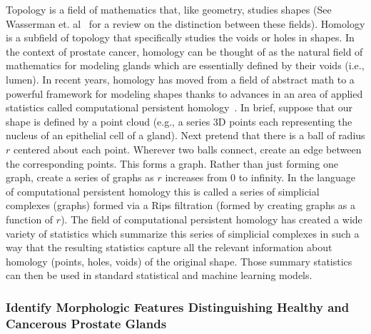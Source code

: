\documentclass{NIHGrant}
\theoremstyle{theorem}
\begin{document}
Topology is a field of mathematics that, like geometry, studies shapes (See Wasserman et. al~\cite{wasserman_topological_2018} for a review on the distinction between these fields). Homology is a subfield of topology that specifically studies the voids or holes in shapes. In the context of prostate cancer, homology can be thought of as the natural field of mathematics for modeling glands which are essentially defined by their voids (i.e., lumen). In recent years, homology has moved from a field of abstract math to a powerful framework for modeling shapes thanks to advances in an area of applied statistics called computational persistent homology~\cite{wasserman_topological_2018,chazal_introduction_2021}. In brief, suppose that our shape is defined by a point cloud (e.g., a series 3D points each representing the nucleus of an epithelial cell of a gland). Next pretend that there is a ball of radius \(r\) centered about each point. Wherever two balls connect, create an edge between the corresponding points. This forms a graph. Rather than just forming one graph, create a series of graphs as \(r\) increases from 0 to infinity. In the language of computational persistent homology this is called a series of simplicial complexes (graphs) formed via a Rips filtration (formed by creating graphs as a function of \(r\)). The field of computational persistent homology has created a wide variety of statistics which summarize this series of simplicial complexes in such a way that the resulting statistics capture all the relevant information about homology (points, holes, voids) of the original shape. Those summary statistics can then be used in standard statistical and machine learning models.

\subsubsection*{Identify Morphologic Features Distinguishing Healthy and Cancerous Prostate Glands} \label{aim3.1}
\end{document}
